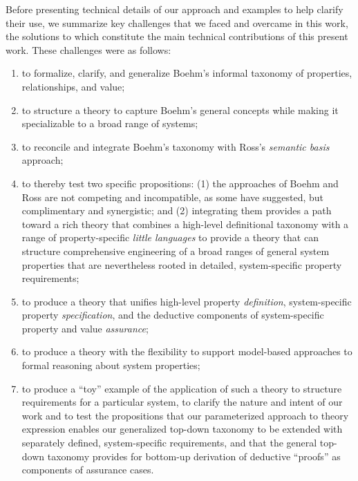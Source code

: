 \documentclass[conference]{IEEEtran}
\begin{document}
Before presenting technical details of our approach and examples to help clarify their use, we summarize key challenges that we faced and overcame in this work, the solutions to which constitute the main technical contributions of this present work. These challenges were as follows:
\begin{enumerate}
\item to formalize, clarify, and generalize Boehm's informal taxonomy of properties, relationships, and value;
\item to structure a theory to capture Boehm's general concepts while making it specializable to a broad range of systems;
\item to reconcile and integrate Boehm's taxonomy with Ross's {\em semantic basis} approach;
\item to thereby test two specific propositions: (1) the approaches of Boehm and Ross are not competing and incompatible, as some have suggested, but complimentary and synergistic; and (2) integrating them provides a path toward a rich theory that combines a high-level definitional taxonomy with a range of property-specific {\em little languages} to provide a theory that can structure comprehensive engineering of a broad ranges of general system properties that are nevertheless rooted in detailed, system-specific property requirements;
\item to produce a theory that unifies high-level property {\em definition}, system-specific property {\em specification}, and the deductive components of system-specific property and value {\em assurance};
\item to produce a theory with the flexibility to support model-based approaches to formal reasoning about system properties;
\item to produce a ``toy'' example of the application of such a theory to structure requirements for a particular system, to clarify the nature and intent of our work and to test the propositions that our parameterized approach to theory expression enables our generalized top-down taxonomy to be extended with separately defined, system-specific requirements, and that the general top-down taxonomy provides for bottom-up derivation of deductive ``proofs'' as components of assurance cases.
\end{enumerate}
\end{document}
